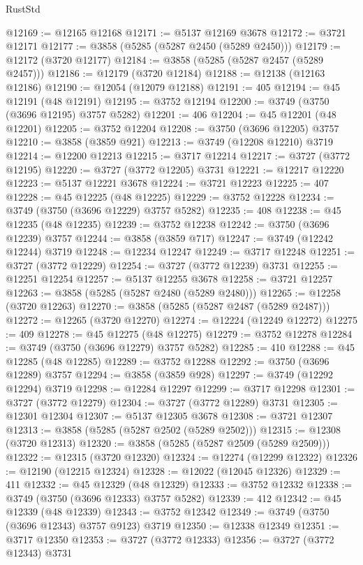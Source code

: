 \begin{lexlean}{RustStd}
\begin{coremodule}
@12169 := @12165 @12168
@12171 := @5137 @12169 @3678
@12172 := @3721 @12171
@12177 := @3858 (@5285 (@5287 @2450 (@5289 @2450)))
@12179 := @12172 (@3720 @12177)
@12184 := @3858 (@5285 (@5287 @2457 (@5289 @2457)))
@12186 := @12179 (@3720 @12184)
@12188 := @12138 (@12163 @12186)
@12190 := @12054 (@12079 @12188)
@12191 := 405
@12194 := @45 @12191 (@48 @12191)
@12195 := @3752 @12194
@12200 := @3749 (@3750 (@3696 @12195) @3757 @5282)
@12201 := 406
@12204 := @45 @12201 (@48 @12201)
@12205 := @3752 @12204
@12208 := @3750 (@3696 @12205) @3757
@12210 := @3858 (@3859 @921)
@12213 := @3749 (@12208 @12210) @3719
@12214 := @12200 @12213
@12215 := @3717 @12214
@12217 := @3727 (@3772 @12195)
@12220 := @3727 (@3772 @12205) @3731
@12221 := @12217 @12220
@12223 := @5137 @12221 @3678
@12224 := @3721 @12223
@12225 := 407
@12228 := @45 @12225 (@48 @12225)
@12229 := @3752 @12228
@12234 := @3749 (@3750 (@3696 @12229) @3757 @5282)
@12235 := 408
@12238 := @45 @12235 (@48 @12235)
@12239 := @3752 @12238
@12242 := @3750 (@3696 @12239) @3757
@12244 := @3858 (@3859 @717)
@12247 := @3749 (@12242 @12244) @3719
@12248 := @12234 @12247
@12249 := @3717 @12248
@12251 := @3727 (@3772 @12229)
@12254 := @3727 (@3772 @12239) @3731
@12255 := @12251 @12254
@12257 := @5137 @12255 @3678
@12258 := @3721 @12257
@12263 := @3858 (@5285 (@5287 @2480 (@5289 @2480)))
@12265 := @12258 (@3720 @12263)
@12270 := @3858 (@5285 (@5287 @2487 (@5289 @2487)))
@12272 := @12265 (@3720 @12270)
@12274 := @12224 (@12249 @12272)
@12275 := 409
@12278 := @45 @12275 (@48 @12275)
@12279 := @3752 @12278
@12284 := @3749 (@3750 (@3696 @12279) @3757 @5282)
@12285 := 410
@12288 := @45 @12285 (@48 @12285)
@12289 := @3752 @12288
@12292 := @3750 (@3696 @12289) @3757
@12294 := @3858 (@3859 @928)
@12297 := @3749 (@12292 @12294) @3719
@12298 := @12284 @12297
@12299 := @3717 @12298
@12301 := @3727 (@3772 @12279)
@12304 := @3727 (@3772 @12289) @3731
@12305 := @12301 @12304
@12307 := @5137 @12305 @3678
@12308 := @3721 @12307
@12313 := @3858 (@5285 (@5287 @2502 (@5289 @2502)))
@12315 := @12308 (@3720 @12313)
@12320 := @3858 (@5285 (@5287 @2509 (@5289 @2509)))
@12322 := @12315 (@3720 @12320)
@12324 := @12274 (@12299 @12322)
@12326 := @12190 (@12215 @12324)
@12328 := @12022 (@12045 @12326)
@12329 := 411
@12332 := @45 @12329 (@48 @12329)
@12333 := @3752 @12332
@12338 := @3749 (@3750 (@3696 @12333) @3757 @5282)
@12339 := 412
@12342 := @45 @12339 (@48 @12339)
@12343 := @3752 @12342
@12349 := @3749 (@3750 (@3696 @12343) @3757 @9123) @3719
@12350 := @12338 @12349
@12351 := @3717 @12350
@12353 := @3727 (@3772 @12333)
@12356 := @3727 (@3772 @12343) @3731

\end{coremodule}
\end{lexlean}
